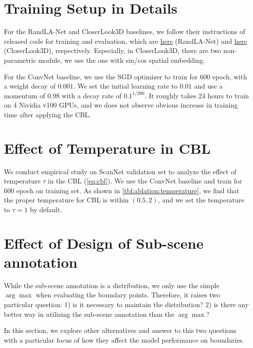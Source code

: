 \documentclass[10pt,twocolumn,letterpaper]{article}
\begin{document}
\section{Training Setup in Details}
\label{sec:sup:train}
For the RandLA-Net\cite{randlanet} and CloserLook3D\cite{closerlook} baselines, we follow their instructions of released code for training and evaluation, which are \href{https://github.com/QingyongHu/RandLA-Net}{here} (RandLA-Net) and \href{https://github.com/zeliu98/CloserLook3D}{here} (CloserLook3D), respectively. Especially, in CloserLook3D\cite{closerlook}, there are two non-parametric module, we use the one with sin/cos spatial embedding.

For the ConvNet baseline, we use the SGD optimizer to train for 600 epoch, with a weight decay of $0.001$. We set the initial learning rate to $0.01$ and use a momentum of $0.98$ with a decay rate of $0.1^{1/200}$. It roughly takes 24 hours to train on 4 Nividia v100 GPUs, and we does not observe obvious increase in training time after applying the CBL.

\section{Effect of Temperature in CBL}
\label{sec:sup:ablation:temperature}
We conduct empirical study on ScanNet\cite{scannet} validation set to analyze the effect of temperature $\tau$ in the CBL (\cref{eq:cbl}). We use the ConvNet baseline and train for 600 epoch on training set. As shown in \cref{tbl:ablation:temperature}, we find that
the proper temperature for CBL is within $(0.5, 2)$, and we set the temperature to $\tau=1$ by default.

\section{Effect of Design of Sub-scene annotation}
\label{sec:sup:argmax}
While the sub-scene annotation is a distribution, we only use the simple $\arg\max$ when evaluating the boundary points. Therefore, it raises two particular question: 1) is it necessary to maintain the distribution? 2) is there any better way in utilizing the sub-scene annotation than the $\arg\max$?

In this section, we explore other alternatives and answer to this two questions with a particular focus of how they affect the model performance on boundaries.
\end{document}
